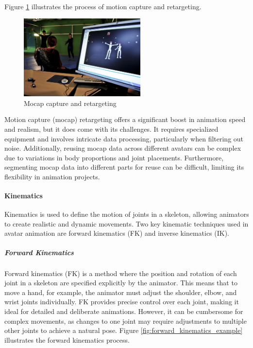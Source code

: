 \documentclass[../../main.tex]{subfiles}
\begin{document}
Figure \ref{fig:mocap} illustrates the process of motion capture and retargeting.

\begin{figure} 
  \centering \includegraphics[width = 2.5in]{chapters/background_work/images/mocap.png} 
  \caption{Mocap capture and retargeting} 
  \label{fig:mocap} 
\end{figure}

Motion capture (mocap) retargeting offers a significant boost in animation speed and realism, but it does come with its challenges. It requires specialized equipment and involves intricate data processing, particularly when filtering out noise. Additionally, reusing mocap data across different avatars can be complex due to variations in body proportions and joint placements. Furthermore, segmenting mocap data into different parts for reuse can be difficult, limiting its flexibility in animation projects.

\paragraph{Kinematics}
\label{par:kinematics}

Kinematics is used to define the motion of joints in a skeleton, allowing animators to create realistic and dynamic movements. Two key kinematic techniques used in avatar animation are forward kinematics (FK) and inverse kinematics (IK).

\subparagraph{Forward Kinematics}
\label{subpar:forward_kinematics}

Forward kinematics (FK) is a method where the position and rotation of each joint in a skeleton are specified explicitly by the animator. This means that to move a hand, for example, the animator must adjust the shoulder, elbow, and wrist joints individually. FK provides precise control over each joint, making it ideal for detailed and deliberate animations. However, it can be cumbersome for complex movements, as changes to one joint may require adjustments to multiple other joints to achieve a natural pose. Figure \ref{fig:forward_kinematics_example} illustrates the forward kinematics process.
\end{document}
